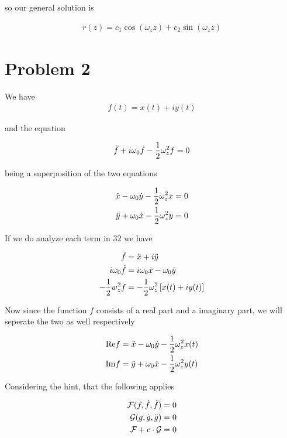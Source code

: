 \documentclass[english,notitlepage]{revtex4-1}  %
\begin{document}
so our general solution is 

\begin{align}
    r(z) = c_1 \cos(\omega_z z) + c_2 \sin(\omega_z z)
\end{align}


\section*{Problem 2}

We have 
\begin{align}
    f(t) = x(t) + i y(t) 
\end{align}

and the equation

\begin{align}
    \Ddot{f} + i\omega_0 \Dot{f} - \frac{1}{2} \omega_z^2 f = 0
\end{align}

being a superposition of the two equations

\begin{align}
    \Ddot{x} - \omega_0 \Dot{y} - \frac{1}{2} \omega_z^2 x &= 0
    \\
    \Ddot{y} + \omega_0 \Dot{x} - \frac{1}{2} \omega_z^2 y &= 0
\end{align}

If we do analyze each term in $32$ we have

\begin{align}
    \Ddot{f} &= \Ddot{x} + i \Ddot{y}
    \\
    i \omega_0 \Dot{f} &= i \omega_0\Dot{x} - \omega_0\Dot{y}
    \\
    - \frac{1}{2} w_z^2 f &= - \frac{1}{2} \omega_z^2 \left[ x(t) + i y(t) \right]
\end{align}

Now since the function $f$ consists of a real part and a imaginary part, we will seperate the two as well respectively

\begin{align}
   \text{Re}f &= \Ddot{x} - \omega_0\Dot{y} - \frac{1}{2}\omega_z^2 x(t)
   \\
   \text{Im}f &= \Ddot{y} + \omega_0\Dot{x} - \frac{1}{2}\omega_z^2 y(t)
\end{align}

Considering the hint, that the following applies

\begin{align}
    \mathcal{F}( f, \Dot{f}, \Ddot{f}) &= 0
    \\
    \mathcal{G}( g, \Dot{g}, \Ddot{g}) &= 0
    \\
    \mathcal{F} + c \cdot  \mathcal{G} &= 0
\end{align}
\end{document}
